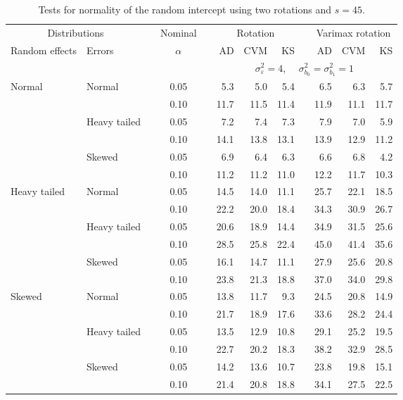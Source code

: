 \begin{table}[ht]
\caption{\label{tab:simb0s45-alt}Tests for normality of the random intercept using two rotations and $s = 45$.}
\begin{scriptsize}
\begin{center}
\begin{tabular}{ll p{.1cm} c p{.1cm} rrr p{.1cm} rrr}
  \hline
  \multicolumn{2}{c}{Distributions}& & Nominal & &  \multicolumn{3}{c}{Rotation} & & \multicolumn{3}{c}{Varimax rotation} \\ \cline{1-2} \cline{6-8} \cline{10-12}   
  Random effects & Errors & & $\alpha$ & & AD & CVM & KS & & AD & CVM & KS \\ 
   \hline
& && && \multicolumn{7}{c}{$\sigma_{\varepsilon}^2 = 4$, \ \ $\sigma_{b_0}^2 = \sigma_{b_1}^2 = 1$} \\ \cline{6-12}
Normal       & Normal       && 0.05 &&   5.3 & 5.0 & 5.4 &   & 6.5 & 6.3 & 5.7 \\ 
             &              && 0.10 &&   11.7 & 11.5 & 11.4 &   & 11.9 & 11.1 & 11.7 \\ 
             & Heavy tailed && 0.05 &&   7.2 & 7.4 & 7.3 &   & 7.9 & 7.0 & 5.9 \\ 
             &              && 0.10 &&   14.1 & 13.8 & 13.1 &   & 13.9 & 12.9 & 11.2 \\ 
             & Skewed       && 0.05 &&   6.9 & 6.4 & 6.3 &   & 6.6 & 6.8 & 4.2 \\ 
             &              && 0.10 &&   11.2 & 11.2 & 11.0 &   & 12.2 & 11.7 & 10.3 \\ 
Heavy tailed & Normal       && 0.05 &&   14.5 & 14.0 & 11.1 &   & 25.7 & 22.1 & 18.5 \\ 
             &              && 0.10 &&   22.2 & 20.0 & 18.4 &   & 34.3 & 30.9 & 26.7 \\ 
             & Heavy tailed && 0.05 &&   20.6 & 18.9 & 14.4 &   & 34.9 & 31.5 & 25.6 \\ 
             &              && 0.10 &&   28.5 & 25.8 & 22.4 &   & 45.0 & 41.4 & 35.6 \\ 
             & Skewed       && 0.05 &&   16.1 & 14.7 & 11.1 &   & 27.9 & 25.6 & 20.8 \\ 
             &              && 0.10 &&   23.8 & 21.3 & 18.8 &   & 37.0 & 34.0 & 29.8 \\ 
Skewed       & Normal       && 0.05 &&   13.8 & 11.7 & 9.3 &   & 24.5 & 20.8 & 14.9 \\ 
             &              && 0.10 &&   21.7 & 18.9 & 17.6 &   & 33.6 & 28.2 & 24.4 \\ 
             & Heavy tailed && 0.05 &&   13.5 & 12.9 & 10.8 &   & 29.1 & 25.2 & 19.5 \\ 
             &              && 0.10 &&   22.7 & 20.2 & 18.3 &   & 38.2 & 32.9 & 28.5 \\ 
             & Skewed       && 0.05 &&   14.2 & 13.6 & 10.7 &   & 23.8 & 19.8 & 15.1 \\ 
             &              && 0.10 &&   21.4 & 20.8 & 18.8 &   & 34.1 & 27.5 & 22.5 \\ 


\end{tabular}
\end{center}
\end{scriptsize}
\end{table}
